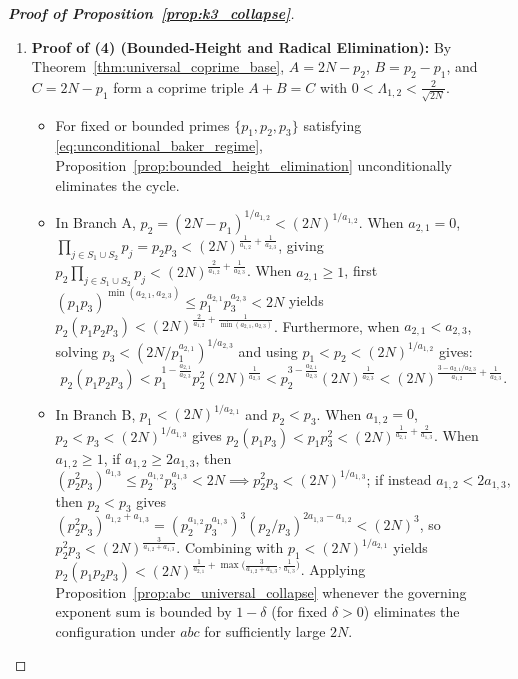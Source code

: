 \documentclass[11pt,a4paper]{article}
\theoremstyle{definition}
\begin{document}
\begin{proof}[\textbf{Proof of Proposition~\ref{prop:k3_collapse}}]
\begin{enumerate}
    \item \textbf{Proof of (4) (Bounded-Height and Radical Elimination):}  
    By Theorem~\ref{thm:universal_coprime_base}, $A = 2N - p_2$, $B = p_2 - p_1$, and $C = 2N - p_1$ form a coprime triple $A + B = C$ with $0 < \Lambda_{1,2} < \frac{2}{\sqrt{2N}}$.
    \begin{itemize}
        \item For fixed or bounded primes $\{p_1, p_2, p_3\}$ satisfying \eqref{eq:unconditional_baker_regime}, Proposition~\ref{prop:bounded_height_elimination} unconditionally eliminates the cycle.
        \item In Branch A, $p_2 = (2N - p_1)^{1/a_{1,2}} < (2N)^{1/a_{1,2}}$. When $a_{2,1} = 0$, $\prod_{j \in S_1 \cup S_2} p_j = p_2 p_3 < (2N)^{\frac{1}{a_{1,2}} + \frac{1}{a_{2,3}}}$, giving $p_2 \prod_{j \in S_1 \cup S_2} p_j < (2N)^{\frac{2}{a_{1,2}} + \frac{1}{a_{2,3}}}$. When $a_{2,1} \ge 1$, first $(p_1 p_3)^{\min(a_{2,1}, a_{2,3})} \le p_1^{a_{2,1}} p_3^{a_{2,3}} < 2N$ yields $p_2(p_1 p_2 p_3) < (2N)^{\frac{2}{a_{1,2}} + \frac{1}{\min(a_{2,1}, a_{2,3})}}$. Furthermore, when $a_{2,1} < a_{2,3}$, solving $p_3 < (2N / p_1^{a_{2,1}})^{1/a_{2,3}}$ and using $p_1 < p_2 < (2N)^{1/a_{1,2}}$ gives:
        \[
        p_2 (p_1 p_2 p_3) < p_1^{1 - \frac{a_{2,1}}{a_{2,3}}} p_2^2 (2N)^{\frac{1}{a_{2,3}}} < p_2^{3 - \frac{a_{2,1}}{a_{2,3}}} (2N)^{\frac{1}{a_{2,3}}} < (2N)^{\frac{3 - a_{2,1}/a_{2,3}}{a_{1,2}} + \frac{1}{a_{2,3}}}.
        \]
        \item In Branch B, $p_1 < (2N)^{1/a_{2,1}}$ and $p_2 < p_3$. When $a_{1,2} = 0$, $p_2 < p_3 < (2N)^{1/a_{1,3}}$ gives $p_2(p_1 p_3) < p_1 p_3^2 < (2N)^{\frac{1}{a_{2,1}} + \frac{2}{a_{1,3}}}$. When $a_{1,2} \ge 1$, if $a_{1,2} \ge 2a_{1,3}$, then $(p_2^2 p_3)^{a_{1,3}} \le p_2^{a_{1,2}} p_3^{a_{1,3}} < 2N \implies p_2^2 p_3 < (2N)^{1/a_{1,3}}$; if instead $a_{1,2} < 2a_{1,3}$, then $p_2 < p_3$ gives $(p_2^2 p_3)^{a_{1,2} + a_{1,3}} = (p_2^{a_{1,2}} p_3^{a_{1,3}})^3 (p_2 / p_3)^{2a_{1,3} - a_{1,2}} < (2N)^3$, so $p_2^2 p_3 < (2N)^{\frac{3}{a_{1,2} + a_{1,3}}}$. Combining with $p_1 < (2N)^{1/a_{2,1}}$ yields $p_2(p_1 p_2 p_3) < (2N)^{\frac{1}{a_{2,1}} + \max\bigl(\frac{3}{a_{1,2} + a_{1,3}}, \frac{1}{a_{1,3}}\bigr)}$. Applying Proposition~\ref{prop:abc_universal_collapse} whenever the governing exponent sum is bounded by $1 - \delta$ (for fixed $\delta > 0$) eliminates the configuration under $abc$ for sufficiently large $2N$.
    \end{itemize}
\end{enumerate}
\end{proof}
\end{document}
